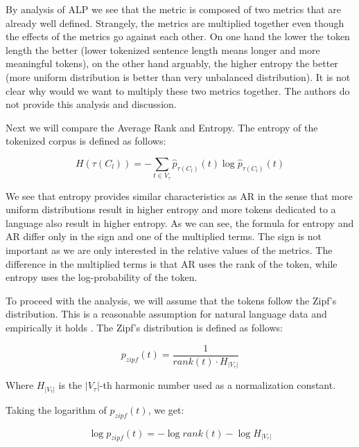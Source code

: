 By analysis of ALP we see that the metric is composed of two metrics that are already well defined. Strangely, the metrics are multiplied together even though the effects of the metrics go against each other. On one hand the lower the token length the better (lower tokenized sentence length means longer and more meaningful tokens), on the other hand arguably, the higher entropy the better (more uniform distribution is better than very unbalanced distribution). It is not clear why would we want to multiply these two metrics together. The authors do not provide this analysis and discussion. 

Next we will compare the Average Rank and Entropy. The entropy of the tokenized corpus is defined as follows:

\begin{equation}
    H(\tau(C_l)) = - \sum_{t \in V_\tau} \hat{p}_{\tau(C_l)}(t) \log \hat{p}_{\tau(C_l)}(t)
\end{equation}

We see that entropy provides similar characteristics as AR in the sense that more uniform distributions result in higher entropy and more tokens dedicated to a language also result in higher entropy. As we can see, the formula for entropy and AR differ only in the sign and one of the multiplied terms. The sign is not important as we are only interested in the relative values of the metrics. The difference in the multiplied terms is that AR uses the rank of the token, while entropy uses the log-probability of the token. 

To proceed with the analysis, we will assume that the tokens follow the Zipf's distribution. This is a reasonable assumption for natural language data and empirically it holds . The Zipf's distribution is defined as follows:

\begin{equation}
    p_{zipf}(t) = \frac{1}{rank(t) \cdot H_{|V_\tau|}}
\end{equation}

Where $H_{|V_\tau|}$ is the $|V_\tau|$-th harmonic number used as a normalization constant.

Taking the logarithm of $p_{zipf}(t)$, we get:

\begin{equation}
    \log p_{zipf}(t) = - \log rank(t) - \log H_{|V_\tau|}
\end{equation}

